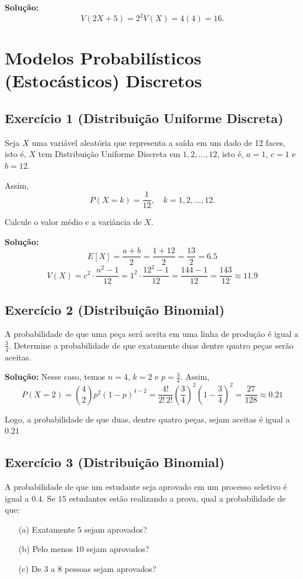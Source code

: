 \documentclass{article}
\begin{document}
\vspace{0.5cm}
\textbf{Solução:}
    $$
    V(2X + 5) = 2^2 V(X) = 4(4) = 16.
    $$

\section{Modelos Probabilísticos (Estocásticos) Discretos}
\subsection{Exercício 1 (Distribuição Uniforme Discreta)}
Seja $X$ uma variável aleatória que representa a saída em um dado de 12 faces, isto é, $X$ tem Distribuição Uniforme Discreta em $1,2,\ldots,12$, isto é, $a = 1$, $c = 1$ e $b = 12$. 

Assim,  
    $$
    P(X = k) = \frac{1}{12}, \quad k = 1,2,\ldots,12.
    $$

Calcule o valor médio e a variância de $X$.

\vspace{0.5cm}
\textbf{Solução:}
    $$
    E[X] = \frac{a+b}{2} = \frac{1 + 12}{2} = \frac{13}{2} = 6.5
    $$
    $$
    V(X) = c^2 \cdot \frac{n^2 - 1}{12} 
          = 1^2 \cdot \frac{12^2 - 1}{12} 
          = \frac{144 - 1}{12} 
          = \frac{143}{12} \approx 11.9
    $$

\subsection{Exercício 2 (Distribuição Binomial)}
A probabilidade de que uma peça será aceita em uma linha de produção é igual a $\tfrac{3}{4}$. Determine a probabilidade de que exatamente duas dentre quatro peças serão aceitas.

\vspace{0.5cm}
\textbf{Solução:}
Nesse caso, temos $n = 4$, $k = 2$ e $p = \tfrac{3}{4}$. Assim,
    $$
    P(X = 2) = \binom{4}{2} p^2 (1-p)^{4-2} 
    = \frac{4!}{2! \, 2!} \left(\frac{3}{4}\right)^2 \left(1 - \frac{3}{4}\right)^2 
    = \frac{27}{128} \approx 0.21
    $$

Logo, a probabilidade de que duas, dentre quatro peças, sejam aceitas é igual a $0.21$

\subsection{Exercício 3 (Distribuição Binomial)}
A probabilidade de que um estudante seja aprovado em um processo seletivo é igual a $0.4$. Se $15$ estudantes estão realizando a prova, qual a probabilidade de que:  
\begin{enumerate}
    \item[(a)] Exatamente $5$ sejam aprovados?
    \item[(b)] Pelo menos $10$ sejam aprovados?
    \item[(c)] De $3$ a $8$ pessoas sejam aprovados?
\end{enumerate}
\end{document}
